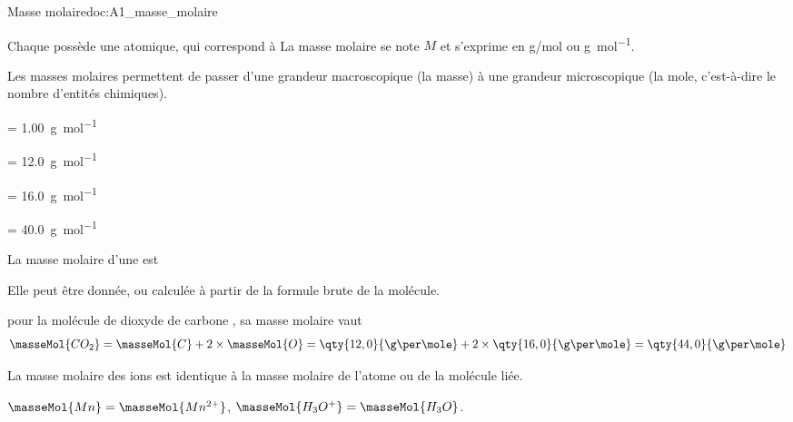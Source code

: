\newpage
\vspace*{-36pt}
\begin{doc}{Masse molaire}{doc:A1_masse_molaire}
  \begin{importants}
    Chaque  possède une  atomique, qui correspond à 
    La masse molaire se note $M$ et s'exprime en \unit{\g/\mole} ou \unit{\g\per\mole}.
  \end{importants}
  Les masses molaires permettent de passer d'une grandeur macroscopique (la masse) à une grandeur microscopique (la mole, c'est-à-dire le nombre d'entités chimiques).

  \begin{donnees}
    \item {}  = \qty{1,00}{\g\per\mole}
    \item {}  = \qty{12,0}{\g\per\mole}
    \item {}  = \qty{16,0}{\g\per\mole}
    \item {} = \qty{40,0}{\g\per\mole}
  \end{donnees}

  \begin{importants}
    La masse molaire d'une  est 
  \end{importants}
  Elle peut être donnée, ou calculée à partir de la formule brute de la molécule.

  \exemple pour la molécule de dioxyde de carbone , sa masse molaire vaut
  \begin{equation*}
    \masseMol{CO_2} = \masseMol{C} + 2 \times \masseMol{O}
    = \qty{12,0}{\g\per\mole} + 2\times\qty{16,0}{\g\per\mole}
    = \qty{44,0}{\g\per\mole}
  \end{equation*}

  \begin{importants}
    La masse molaire des ions est identique à la masse molaire de l'atome ou de la molécule liée.
  \end{importants}

  \exemples $\masseMol{Mn} = \masseMol{Mn^{2+}}$,
  $\masseMol{H_3O^{+}} = \masseMol{H_3O}$.
\end{doc}



